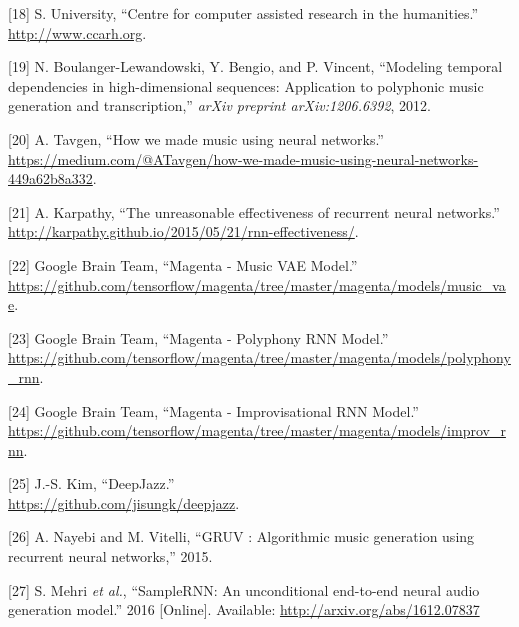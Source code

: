 \documentclass[12pt,]{article}
\begin{document}
\leavevmode\hypertarget{ref-ccarh}{}%
{[}18{]} S. University, ``Centre for computer assisted research in the
humanities.'' \\
\url{http://www.ccarh.org}.

\leavevmode\hypertarget{ref-boulanger2012modeling}{}%
{[}19{]} N. Boulanger-Lewandowski, Y. Bengio, and P. Vincent, ``Modeling
temporal dependencies in high-dimensional sequences: Application to
polyphonic music generation and transcription,'' \emph{arXiv preprint
arXiv:1206.6392}, 2012.

\leavevmode\hypertarget{ref-alextavgen}{}%
{[}20{]} A. Tavgen, ``How we made music using neural networks.'' \\
\url{https://medium.com/@ATavgen/how-we-made-music-using-neural-networks-449a62b8a332}.

\leavevmode\hypertarget{ref-karpathy}{}%
{[}21{]} A. Karpathy, ``The unreasonable effectiveness of recurrent
neural networks.'' \\
\url{http://karpathy.github.io/2015/05/21/rnn-effectiveness/}.

\leavevmode\hypertarget{ref-magentavae}{}%
{[}22{]} \relax Google Brain Team, ``Magenta - Music VAE Model.'' \\
\url{https://github.com/tensorflow/magenta/tree/master/magenta/models/music_vae}.

\leavevmode\hypertarget{ref-magentapolyphony}{}%
{[}23{]} \relax Google Brain Team, ``Magenta - Polyphony RNN Model.'' \\
\url{https://github.com/tensorflow/magenta/tree/master/magenta/models/polyphony_rnn}.

\leavevmode\hypertarget{ref-magentaimprov}{}%
{[}24{]} \relax Google Brain Team, ``Magenta - Improvisational RNN
Model.'' \\
\url{https://github.com/tensorflow/magenta/tree/master/magenta/models/improv_rnn}.

\leavevmode\hypertarget{ref-deepjazz}{}%
{[}25{]} J.-S. Kim, ``DeepJazz.'' \\
\url{https://github.com/jisungk/deepjazz}.

\leavevmode\hypertarget{ref-Nayebi2015GRUVA}{}%
{[}26{]} A. Nayebi and M. Vitelli, ``GRUV : Algorithmic music generation
using recurrent neural networks,'' 2015.

\leavevmode\hypertarget{ref-mehri2016samplernn}{}%
{[}27{]} S. Mehri \emph{et al.}, ``SampleRNN: An unconditional
end-to-end neural audio generation model.'' 2016 {[}Online{]}.
Available: \url{http://arxiv.org/abs/1612.07837}
\end{document}
